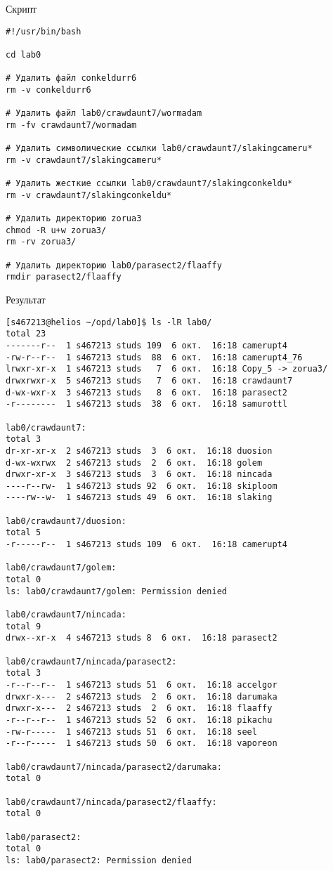 Скрипт
\begin{verbatim}
#!/usr/bin/bash

cd lab0

# Удалить файл conkeldurr6
rm -v conkeldurr6

# Удалить файл lab0/crawdaunt7/wormadam
rm -fv crawdaunt7/wormadam

# Удалить символические ссылки lab0/crawdaunt7/slakingcameru*
rm -v crawdaunt7/slakingcameru*

# Удалить жесткие ссылки lab0/crawdaunt7/slakingconkeldu*
rm -v crawdaunt7/slakingconkeldu*

# Удалить директорию zorua3
chmod -R u+w zorua3/
rm -rv zorua3/

# Удалить директорию lab0/parasect2/flaaffy
rmdir parasect2/flaaffy
\end{verbatim}

Результат
\begin{verbatim}
[s467213@helios ~/opd/lab0]$ ls -lR lab0/
total 23
-------r--  1 s467213 studs 109  6 окт.  16:18 camerupt4
-rw-r--r--  1 s467213 studs  88  6 окт.  16:18 camerupt4_76
lrwxr-xr-x  1 s467213 studs   7  6 окт.  16:18 Copy_5 -> zorua3/
drwxrwxr-x  5 s467213 studs   7  6 окт.  16:18 crawdaunt7
d-wx-wxr-x  3 s467213 studs   8  6 окт.  16:18 parasect2
-r--------  1 s467213 studs  38  6 окт.  16:18 samurottl

lab0/crawdaunt7:
total 3
dr-xr-xr-x  2 s467213 studs  3  6 окт.  16:18 duosion
d-wx-wxrwx  2 s467213 studs  2  6 окт.  16:18 golem
drwxr-xr-x  3 s467213 studs  3  6 окт.  16:18 nincada
----r--rw-  1 s467213 studs 92  6 окт.  16:18 skiploom
----rw--w-  1 s467213 studs 49  6 окт.  16:18 slaking

lab0/crawdaunt7/duosion:
total 5
-r-----r--  1 s467213 studs 109  6 окт.  16:18 camerupt4

lab0/crawdaunt7/golem:
total 0
ls: lab0/crawdaunt7/golem: Permission denied

lab0/crawdaunt7/nincada:
total 9
drwx--xr-x  4 s467213 studs 8  6 окт.  16:18 parasect2

lab0/crawdaunt7/nincada/parasect2:
total 3
-r--r--r--  1 s467213 studs 51  6 окт.  16:18 accelgor
drwxr-x---  2 s467213 studs  2  6 окт.  16:18 darumaka
drwxr-x---  2 s467213 studs  2  6 окт.  16:18 flaaffy
-r--r--r--  1 s467213 studs 52  6 окт.  16:18 pikachu
-rw-r-----  1 s467213 studs 51  6 окт.  16:18 seel
-r--r-----  1 s467213 studs 50  6 окт.  16:18 vaporeon

lab0/crawdaunt7/nincada/parasect2/darumaka:
total 0

lab0/crawdaunt7/nincada/parasect2/flaaffy:
total 0

lab0/parasect2:
total 0
ls: lab0/parasect2: Permission denied
\end{verbatim}